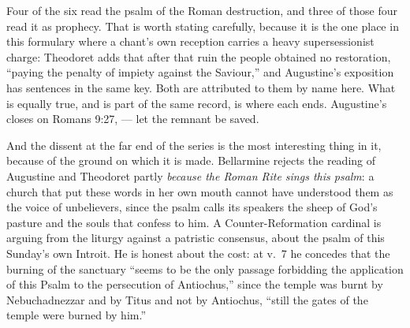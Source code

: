 Four of the six read the psalm of the Roman destruction, and three of those
four read it as prophecy. That is worth stating carefully, because it is the
one place in this formulary where a chant's own reception carries a heavy
supersessionist charge: Theodoret adds that after that ruin the people obtained
no restoration, ``paying the penalty of impiety against the Saviour,'' and
Augustine's exposition has sentences in the same key. Both are attributed to
them by name here. What is equally true, and is part of the same record, is
where each ends. Augustine's  closes on Romans 9:27,
 --- let the remnant be saved.

And the dissent at the far end of the series is the most interesting thing in
it, because of the ground on which it is made. Bellarmine rejects the reading
of Augustine and Theodoret partly \emph{because the Roman Rite sings this
psalm}: a church that put these words in her own mouth cannot have understood
them as the voice of unbelievers, since the psalm calls its speakers the sheep
of God's pasture and the souls that confess to him. A Counter-Reformation
cardinal is arguing from the liturgy against a patristic consensus, about the
psalm of this Sunday's own Introit. He is honest about the cost: at v.~7 he
concedes that the burning of the sanctuary ``seems to be the only passage
forbidding the application of this Psalm to the persecution of Antiochus,''
since the temple was burnt by Nebuchadnezzar and by Titus and not by Antiochus,
``still the gates of the temple were burned by him.''

